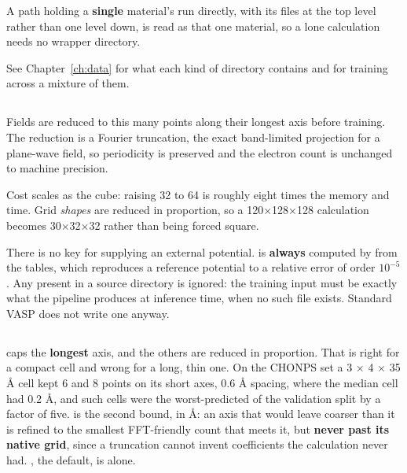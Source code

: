 A path holding a \textbf{single} material's run directly, with its files at the top level rather than one level down, is read as that one material, so a lone calculation needs no wrapper directory.

See Chapter~\ref{ch:data} for what each kind of directory contains and for training across a mixture of them.

\subsection{}

Fields are reduced to this many points along their longest axis before training. The reduction is a Fourier truncation, the exact band-limited projection for a plane-wave field, so periodicity is preserved and the electron count is unchanged to machine precision.

Cost scales as the cube: raising 32 to 64 is roughly eight times the memory and time. Grid \emph{shapes} are reduced in proportion, so a 120$\times$128$\times$128 calculation becomes 30$\times$32$\times$32 rather than being forced square.

\begin{pnote}
There is no key for supplying an external potential.  is \textbf{always} computed by  from the  tables, which reproduces a reference potential to a relative error of order $10^{-5}$. Any  present in a source directory is ignored: the training input must be exactly what the pipeline produces at inference time, when no such file exists. Standard VASP does not write one anyway.
\end{pnote}

\subsection{}

\label{sec:max-spacing}

 caps the \textbf{longest} axis, and the others are reduced in proportion. That is right for a compact cell and wrong for a long, thin one. On the CHONPS set a 3 $\times$ 4 $\times$ 35 \AA{} cell kept 6 and 8 points on its short axes, 0.6 \AA{} spacing, where the median cell had 0.2 \AA{}, and such cells were the worst-predicted of the validation split by a factor of five.  is the second bound, in \AA{}: an axis that  would leave coarser than it is refined to the smallest FFT-friendly count that meets it, but \textbf{never past its native grid}, since a truncation cannot invent coefficients the calculation never had. , the default, is  alone.

